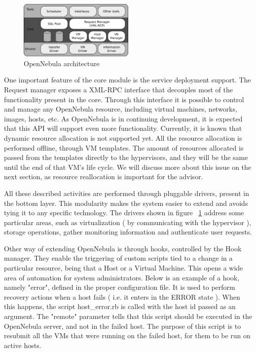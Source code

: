 \documentclass[jidm,a4paper]{jidm} %
\begin{document}
\begin{figure}[t]
  \centering
 \includegraphics[width=0.5\textwidth]{one-architecture_2.eps}
  \caption{OpenNebula architecture}
  \label{fig:open_arch}
\end{figure}

One important feature of the core module is the service deployment support. The Request manager exposes a XML-RPC interface that decouples most of the functionality present in the core. Through this interface it is possible to control and manage any OpenNebula resource, including virtual machines, networks, images, hosts, etc. As OpenNebula is in continuing development, it is expected that this API will support even more functionality. Currently, it is known that dynamic resource allocation is not supported yet. All the resource allocation is performed offline, through VM templates. The amount of resources allocated is passed from the templates directly to the hypervisors, and they will be the same until the end of that VM's life cycle. We will discuss more about this issue on the next section, as resource reallocation is important for the advisor.

All these described activities are performed through pluggable drivers, present in the bottom layer. This modularity makes the system easier to extend and avoids tying it to any specific technology. The drivers shown in figure ~\ref{fig:open_arch}  address some particular areas, such as virtualization ( by communicating with the hypervisor ), storage operations, gather monitoring information and authenticate user requests.

Other way of extending OpenNebula is through hooks, controlled by the Hook manager. They enable the triggering of custom scripts tied to a change in a particular resource, being that a Host or a Virtual Machine. This opens a wide area of automation for system administrators. Below is an example of a hook, namely "error", defined in the proper configuration file. It is used to perform recovery actions when a host fails ( i.e. it enters in the ERROR state ). When this happens, the script host\_error.rb is called with the host id passed as an argument. The "remote" parameter tells that this script should be executed in the OpenNebula server, and not in the failed host. The purpose of this script is to resubmit all the VMs that were running on the failed host, for them to be run on active hosts. 
\end{document}
